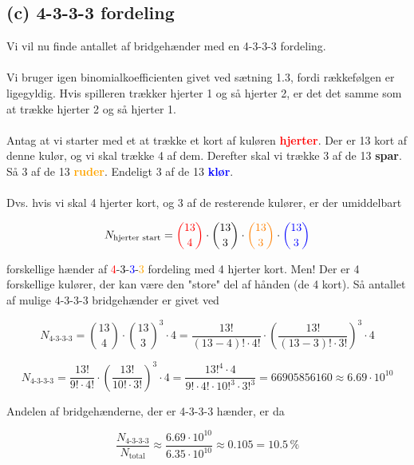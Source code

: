 \subsection*{(c) 4-3-3-3 fordeling}

Vi vil nu finde antallet af bridgehænder med en 4-3-3-3 fordeling.\\
\\
Vi bruger igen binomialkoefficienten givet ved sætning 1.3, fordi rækkefølgen er ligegyldig. Hvis spilleren trækker hjerter 1 og så hjerter 2, er det det samme som at trække hjerter 2 og så hjerter 1.\\
\\
Antag at vi starter med et at trække et kort af kuløren \textcolor{red}{\textbf{hjerter}}. Der er 13 kort af denne kulør, og vi skal trække 4 af dem.  Derefter skal vi trække 3 af de 13 \textbf{spar}. Så 3 af de 13 \textcolor{orange}{\textbf{ruder}}. Endeligt 3 af de 13 \textcolor{blue}{\textbf{klør}}.
\\
\\
Dvs. hvis vi skal 4 hjerter kort, og 3 af de resterende kulører, er der umiddelbart

\begin{equation}
     N_{\text{hjerter start}} = \textcolor{red}{{13 \choose 4}}  \cdot {13 \choose 3} \cdot  \textcolor{orange}{{13 \choose 3}} \cdot  \textcolor{blue}{{13 \choose 3}} 
\end{equation}

forskellige hænder af \textcolor{red}{4}-\textcolor{black}{3}-\textcolor{blue}{3}-\textcolor{orange}{3} fordeling med 4 hjerter kort. Men! Der er 4 forskellige kulører, der kan være den "store" del af hånden (de 4 kort). Så antallet af mulige 4-3-3-3 bridgehænder er givet ved

\begin{equation}
     N_{\text{4-3-3-3}} = {13 \choose 4}  \cdot {13 \choose 3}^3 \cdot 4 = \frac{13!}{(13-4)! \cdot 4!} \cdot \left( \frac{13!}{(13-3)! \cdot 3!} \right)^3 \cdot 4
\end{equation}

\begin{equation}
     N_{\text{4-3-3-3}} = \frac{13!}{9! \cdot 4!} \cdot \left( \frac{13!}{10! \cdot 3!} \right)^3 \cdot 4 = \frac{13!^4 \cdot 4}{9! \cdot 4! \cdot 10!^3 \cdot 3!^3} = 66905856160 \approx 6.69 \cdot 10^{10}
\end{equation}

Andelen af bridgehænderne, der er 4-3-3-3 hænder, er da

\begin{equation}
    \frac{N_{\text{4-3-3-3}}}{N_{\text{total}}} \approx \frac{6.69 \cdot 10^{10}}{6.35 \cdot 10^{10}} \approx 0.105 = 10.5 \, \%
\end{equation}